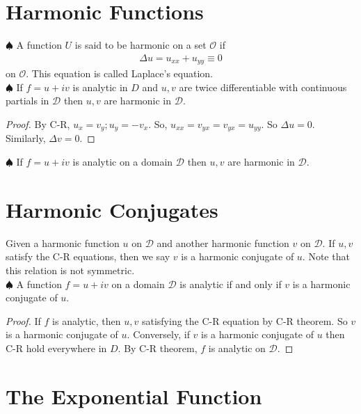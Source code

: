 \documentclass{article}
\theoremstyle{definition}
\begin{document}
\section{Harmonic Functions}

\noindent $\spadesuit$ A function $U$ is said to be harmonic on a set $\mathcal{O}$ if 
\begin{align}
\Delta u = u_{xx} + u_{yy} \equiv 0
\end{align} 
on $\mathcal{O}$. This equation is called Laplace's equation.\\



\noindent $\spadesuit$ If $f = u+ iv$ is analytic in $D$ and $u,v$ are twice differentiable with continuous partials in $\mathcal{D}$ then $u,v$ are harmonic in $\mathcal{D}$. 

\begin{proof}
	By C-R, $u_x = v_y; u_y = -v_x$. So, $u_{xx} = v_{yx} = v_{yx} = u_{yy}$. So $\Delta u = 0$. Similarly, $\Delta v = 0$. 
\end{proof}



\noindent $\spadesuit$ If $f = u+ iv$ is analytic on a domain $\mathcal{D}$ then $u,v$ are harmonic in $\mathcal{D}$. 




\section{Harmonic Conjugates}

Given a harmonic function $u$ on $\mathcal{D}$ and another harmonic function $v$ on $\mathcal{D}$. If $u,v$ satisfy the C-R equations, then we say $v$ is a harmonic conjugate of $u$. Note that this relation is not symmetric. \\

\noindent $\spadesuit$  A function $f = u + iv$ on a domain $\mathcal{D}$ is analytic if and only if $v$ is a harmonic conjugate of $u$. 

\begin{proof}
	If $f$ is analytic, then $u,v$ satisfying the C-R equation by C-R theorem. So $v$ is a harmonic conjugate of $u$. Conversely, if $v$ is a harmonic conjugate of $u$ then C-R hold everywhere in $D$. By C-R theorem, $f$ is analytic on $\mathcal{D}$. 
\end{proof} 



\section{The Exponential Function}
\end{document}
